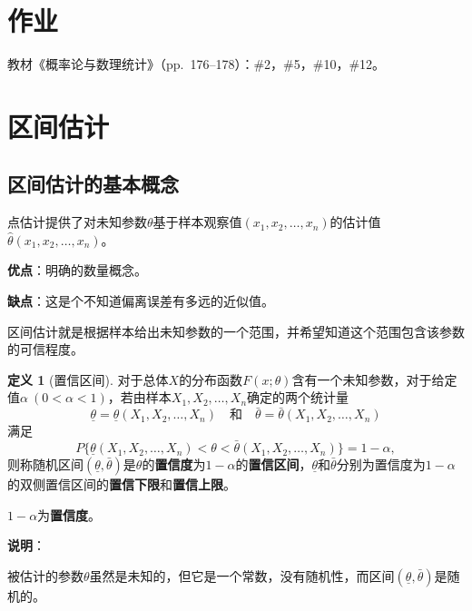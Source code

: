 \documentclass[11pt,a4paper]{report}
\theoremstyle{definition}
\newtheorem{definition}{定义}[chapter]
\begin{document}
\section*{作业}

教材《概率论与数理统计》（pp.~176--178）：\#2，\#5，\#10，\#12。

\section{区间估计}

\subsection{区间估计的基本概念}

点估计提供了对未知参数$\theta$基于样本观察值$(x_{1},x_{2},\ldots,x_{n})$的估计值$\hat{\theta}(x_{1},x_{2},\ldots,x_{n})$。

\textbf{优点}：明确的数量概念。

\textbf{缺点}：这是个不知道偏离误差有多远的近似值。

区间估计就是根据样本给出未知参数的一个范围，并希望知道这个范围包含该参数的可信程度。

\begin{definition}[置信区间]
对于总体$X$的分布函数$F(x;\theta)$含有一个未知参数，对于给定值$\alpha\ (0<\alpha<1)$，若由样本$X_{1},X_{2},\ldots,X_{n}$确定的两个统计量
\[
\underline{\theta}=\underline{\theta}(X_{1},X_{2},\ldots,X_{n})\quad\text{和}\quad\bar{\theta}=\bar{\theta}(X_{1},X_{2},\ldots,X_{n})
\]
满足
\[
P\{\underline{\theta}(X_{1},X_{2},\ldots,X_{n})<\theta<\bar{\theta}(X_{1},X_{2},\ldots,X_{n})\}=1-\alpha,
\]
则称随机区间$(\underline{\theta},\bar{\theta})$是$\theta$的\textbf{置信度}为$1-\alpha$的\textbf{置信区间}，$\underline{\theta}$和$\bar{\theta}$分别为置信度为$1-\alpha$的双侧置信区间的\textbf{置信下限}和\textbf{置信上限}。

$1-\alpha$为\textbf{置信度}。
\end{definition}

\textbf{说明}：

被估计的参数$\theta$虽然是未知的，但它是一个常数，没有随机性，而区间$(\underline{\theta},\bar{\theta})$是随机的。
\end{document}
